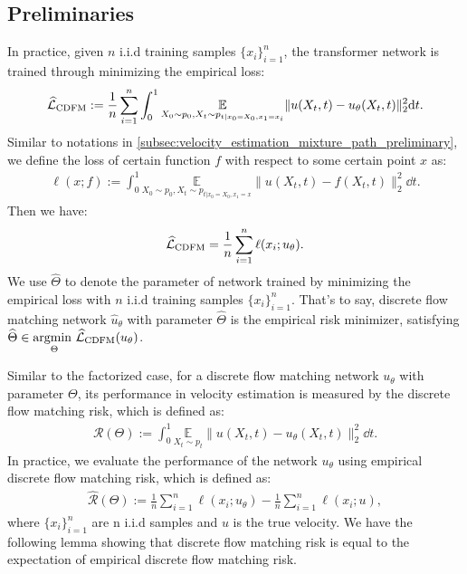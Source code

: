 \documentclass[12pt]{article}
\numberwithin{equation}{section}
\let\hat\widehat
\newcommand{\wh}{\widehat}
\renewcommand{\hat}{\wh}
\DeclareMathOperator*{\E}{{\mathbb{E}}}
\def\E{\mathbb{E}}
\theoremstyle{theoremstyle}
\numberwithin{equation}{section}
\numberwithin{theorem}{section}
\numberwithin{proposition}{section}
\numberwithin{definition}{section}
\numberwithin{lemma}{section}
\numberwithin{assumption}{section}
\numberwithin{remark}{section}
\begin{document}
\subsection{Preliminaries}
\label{sec:pre_velocity_esti_extension}
In practice, given $n$ i.i.d training samples $\{x_i\}_{i=1}^n$, the transformer network is trained through minimizing the empirical loss:
\begin{align*}
    \hat{\mathcal{L}}_{\rm CDFM}:=\frac{1}{n}\sum_{i=1}^n\int_0^1 \underset{X_0\sim p_0,X_t\sim p_{t|x_0=X_0,x_1=x_i}}{\E}\|u(X_t,t)-u_\theta(X_t,t)\|_2^2 \dd t.
\end{align*}
Similar to notations in \cref{subsec:velocity_estimation_mixture_path_preliminary}, we define the loss of certain function $f$ with respect to some certain point $x$ as:
\begin{align*}
    \ell(x;f):=\int_0^1 \underset{X_0\sim p_0,X_t\sim p_{t|x_0=X_0,x_1=x}}{\E}\|u(X_t,t)-f(X_t,t)\|_2^2 \dd t.
\end{align*}
Then we have:
\begin{align*}
    \hat{\mathcal{L}}_{\rm CDFM}=\frac{1}{n}\sum_{i=1}^n\ell(x_i;u_\theta).
\end{align*}
We use $\hat{\Theta}$ to denote the parameter of network trained by minimizing the empirical loss with $n$ i.i.d training samples $\{x_i\}_{i=1}^n$.
That's to say, discrete flow matching network $\hat{u}_\theta$ with parameter $\hat{\Theta}$ is the empirical risk minimizer, satisfying $\hat{\Theta}\in\underset{\Theta}{\rm argmin~}\hat{\mathcal{L}}_{\rm CDFM}(u_\theta)$.

Similar to the factorized case, for a discrete flow matching network $u_\theta$ with parameter $\Theta$, its performance in velocity estimation is measured by the discrete flow matching risk, which is defined as:
\begin{align}\label{eq:definition_of_risk}
    \mathcal{R}(\Theta):=\int_0^1\underset{X_t\sim p_t}{\E}\|u(X_t,t)-u_\theta(X_t,t)\|_2^2 \dd t.
\end{align}
In practice, we evaluate the performance of the network $u_\theta$ using empirical discrete flow matching risk, which is defined as:
\begin{align}\label{eq:definition_of_empirical_risk}
    \hat{\mathcal{R}}(\Theta):=\frac{1}{n}\sum_{i=1}^n\ell(x_i;u_\theta)-\frac{1}{n}\sum_{i=1}^n\ell(x_i;u),
\end{align}
where $\{x_i\}_{i=1}^n$ are n i.i.d samples and $u$ is the true velocity.
We have the following lemma showing that discrete flow matching risk is equal to the expectation of empirical discrete flow matching risk.
\end{document}
